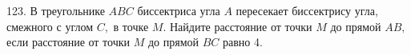 123. В треугольнике $ABC$ биссектриса угла $A$ пересекает биссектрису угла, смежного с углом $C,$ в точке $M.$ Найдите расстояние от точки $M$ до прямой $AB,$ если расстояние от точки $M$ до прямой $BC$ равно 4.\\
